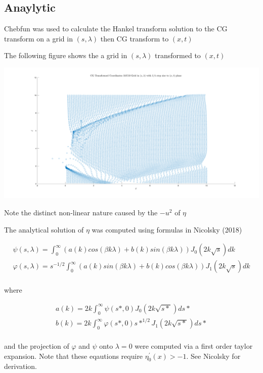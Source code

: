 \documentclass{article}
\begin{document}
\subsection{Anaylytic}

Chebfun was used to calculate the Hankel transform solution to the CG transform on a grid in $(s,\lambda)$ then CG transform to $(x,t)$

\noindent The following figure shows the a grid in $(s,\lambda)$ transformed to $(x,t)$

\includegraphics[width=\linewidth]{images/scatter.png} 

\noindent Note the distinct non-linear nature caused by the $-u^2$ of $\eta$

\noindent The analytical solution of $\eta$ was computed using formulas in Nicolsky (2018)

\[
\begin{aligned}
\psi (s, \lambda ) = \int_{0}^\infty (a(k)cos(\beta k \lambda)+b(k)sin(\beta k \lambda)) J_0(2 k \sqrt s ) dk\\
\varphi (s, \lambda ) =  s^{-1/2} \int_{0}^\infty (a(k)sin(\beta k \lambda)+b(k)cos(\beta k \lambda)) J_1(2 k \sqrt s )dk \\
\end{aligned}
\]

where

\[
\begin{aligned}
a(k) = 2k \int_{0}^\infty \psi(s*,0) J_0(2 k \sqrt {s*})ds*\\
b(k) = 2k \int_{0}^\infty \varphi(s*,0) s*^{1/2} J_1(2 k \sqrt {s*})ds*\\
\end{aligned}
\]

and the projection of $\varphi$ and $\psi$ onto $\lambda = 0$ were computed via a first order taylor expansion. Note that these eqautions require $\eta_0^\prime(x) > -1$.  See Nicolsky for derivation.
\end{document}
